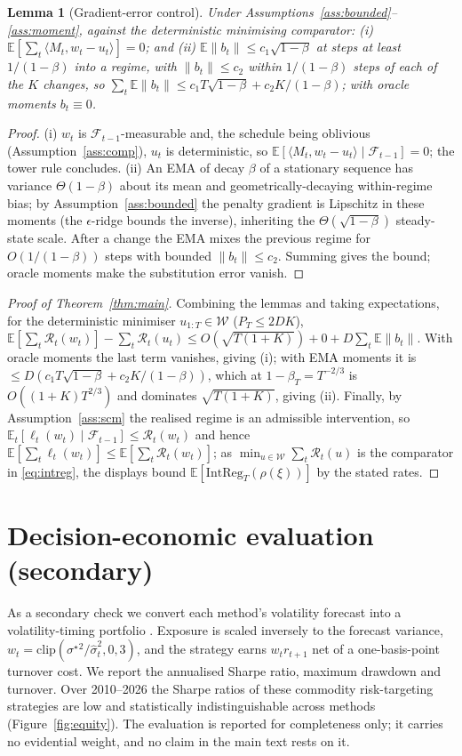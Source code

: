 \documentclass[11pt]{article}
\theoremstyle{plain}
\newtheorem{lemma}{Lemma}
\theoremstyle{remark}
\newcommand{\E}{\mathbb{E}}
\begin{document}
\begin{lemma}[Gradient-error control]\label{lem:mom}
Under Assumptions~\ref{ass:bounded}--\ref{ass:moment}, against the deterministic
minimising comparator: (i) $\E[\sum_t\langle M_t,w_t-u_t\rangle]=0$; and (ii)
$\E\|b_t\|\le c_1\sqrt{1-\beta}$ at steps at least $1/(1-\beta)$ into a regime, with
$\|b_t\|\le c_2$ within $1/(1-\beta)$ steps of each of the $K$ changes, so
$\sum_t\E\|b_t\|\le c_1 T\sqrt{1-\beta}+c_2 K/(1-\beta)$; with oracle moments $b_t\equiv0$.
\end{lemma}
\begin{proof}
(i) $w_t$ is $\mathcal F_{t-1}$-measurable and, the schedule being oblivious
(Assumption~\ref{ass:comp}), $u_t$ is deterministic, so
$\E[\langle M_t,w_t-u_t\rangle\mid\mathcal F_{t-1}]=0$; the tower rule concludes. (ii) An
EMA of decay $\beta$ of a stationary sequence has variance $\Theta(1-\beta)$ about its
mean and geometrically-decaying within-regime bias; by Assumption~\ref{ass:bounded} the
penalty gradient is Lipschitz in these moments (the $\epsilon$-ridge bounds the
inverse), inheriting the $\Theta(\sqrt{1-\beta})$ steady-state scale. After a change the
EMA mixes the previous regime for $O(1/(1-\beta))$ steps with bounded $\|b_t\|\le c_2$.
Summing gives the bound; oracle moments make the substitution error vanish.
\end{proof}

\begin{proof}[Proof of Theorem~\ref{thm:main}]
Combining the lemmas and taking expectations, for the deterministic minimiser
$u_{1:T}\in\mathcal{W}$ ($P_T\le 2DK$),
$\E[\sum_t\mathcal{R}_t(w_t)]-\sum_t\mathcal{R}_t(u_t)\le O(\sqrt{T(1+K)})+0+D\sum_t\E\|b_t\|$.
With oracle moments the last term vanishes, giving (i); with EMA moments it is
$\le D(c_1T\sqrt{1-\beta}+c_2K/(1-\beta))$, which at $1-\beta_T=T^{-2/3}$ is
$O((1+K)T^{2/3})$ and dominates $\sqrt{T(1+K)}$, giving (ii). Finally, by
Assumption~\ref{ass:scm} the realised regime is an admissible intervention, so
$\E_t[\ell_t(w_t)\mid\mathcal F_{t-1}]\le\mathcal{R}_t(w_t)$ and hence
$\E[\sum_t\ell_t(w_t)]\le\E[\sum_t\mathcal{R}_t(w_t)]$; as
$\min_{u\in\mathcal{W}}\sum_t\mathcal{R}_t(u)$ is the comparator in \eqref{eq:intreg}, the
displays bound $\E[\mathrm{IntReg}_T(\rho(\xi))]$ by the stated rates.
\end{proof}

\section{Decision-economic evaluation (secondary)}\label{app:econ}
As a secondary check we convert each method's volatility forecast into a
volatility-timing portfolio \citep{fleming2001voltiming}. Exposure is scaled inversely
to the forecast variance, $w_t=\mathrm{clip}(\sigma^\star{}^2/\hat\sigma_t^2,0,3)$, and
the strategy earns $w_t r_{t+1}$ net of a one-basis-point turnover cost. We report the
annualised Sharpe ratio, maximum drawdown and turnover. Over 2010--2026 the Sharpe ratios
of these commodity risk-targeting strategies are low and statistically indistinguishable
across methods (Figure~\ref{fig:equity}). The evaluation is reported for completeness
only; it carries no evidential weight, and no claim in the main text rests on it.
\end{document}

